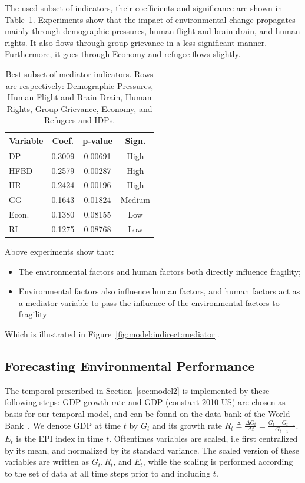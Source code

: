 {The used subset of indicators, their coefficients and significance are shown in Table~\ref{tab:exp:mediator:subset}.
Experiments show that the impact of environmental change propagates mainly through demographic pressures, human flight and brain drain, and human rights. It also flows through group grievance in a less significant manner. Furthermore, it goes through Economy and refugee flows slightly. 

\begin{table}[htbp]
   \centering 
   \begin{tabular}{|l|ccc|} \hline
      Variable & Coef. & p-value & Sign. \\ \hline 
       DP & 0.3009 & 0.00691 & High \\ \hline
       HFBD & 0.2579 & 0.00287 & High \\ \hline
       HR & 0.2424 & 0.00196 & High \\ \hline
       GG & 0.1643 & 0.01824 & Medium \\ \hline
       Econ. & 0.1380 & 0.08155 & Low \\ \hline
       RI & 0.1275 & 0.08768 & Low \\ \hline
   \end{tabular}
   \caption{Best subset of mediator indicators. Rows are respectively: Demographic Pressures, Human Flight and Brain Drain, Human Rights, Group Grievance, Economy, and Refugees and IDPs.}
   \label{tab:exp:mediator:subset}
\end{table}

 Above experiments show that:
\begin{itemize}
   \item The environmental factors and human factors both directly influence fragility;
   \item Environmental factors also influence human factors, and human factors act as a mediator variable to pass the influence of the environmental factors to fragility 
\end{itemize}
Which is illustrated in Figure~\ref{fig:model:indirect:mediator}. 
}


\subsection{Forecasting Environmental Performance}
\label{sec:exp:temporal}
The temporal prescribed in Section~\ref{sec:model2} is implemented by these following steps:
GDP growth rate and GDP (constant 2010 US) are chosen as basis for our temporal model, and can be found on the data bank of the World Bank~\cite{world_bank}.
    We denote GDP at time $t$ by $G_t$ and its growth rate $R_t
    \triangleq\frac{\Delta G_t}{\Delta t} = \frac{G_t-G_{t-1}}{G_{t-1}}$. $E_t$ is the EPI index in time $t$. Oftentimes variables are scaled, i.e first centralized by its mean, and normalized by its standard variance.
    The scaled version of these variables are written as $\overline{G_t}, \overline{R_t}$, and $\overline{E_t}$, while the scaling is performed according to the set of data at all time steps prior to and including $t$.


